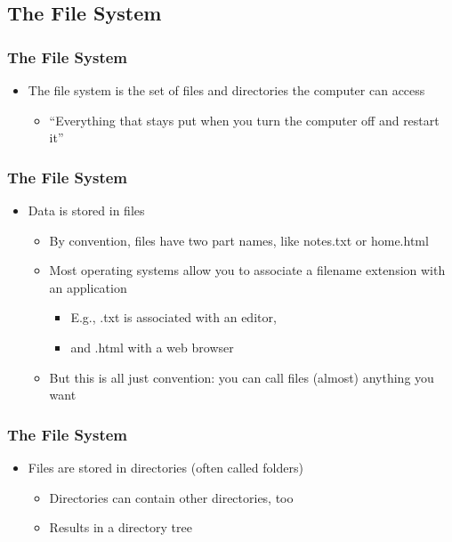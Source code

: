 \documentclass{beamer}
\begin{document}
\subsection{The File System}

\begin{frame}\frametitle{The File System}
\begin{itemize}
\item The file system is the set of files and directories the computer can access
\begin{itemize}
     \item “Everything that stays put when you turn the computer off and restart it”
\end{itemize}
\end{itemize}
\end{frame}

\begin{frame}\frametitle{The File System}
\begin{itemize}
\item Data is stored in files
\begin{itemize}
    \item By convention, files have two part names, like notes.txt or home.html
    \item Most operating systems allow you to associate a filename extension with an application
\begin{itemize}
          \item E.g., .txt is associated with an editor, 
          \item and .html with a web browser
\end{itemize}
    \item But this is all just convention: you can call files (almost) anything you want
\end{itemize}
\end{itemize}
\end{frame}

\begin{frame}\frametitle{The File System}
\begin{itemize}
\item Files are stored in directories (often called folders)
\begin{itemize}
    \item Directories can contain other directories, too
    \item Results in a directory tree
\end{itemize}
\end{itemize}
\end{frame}
\end{document}
